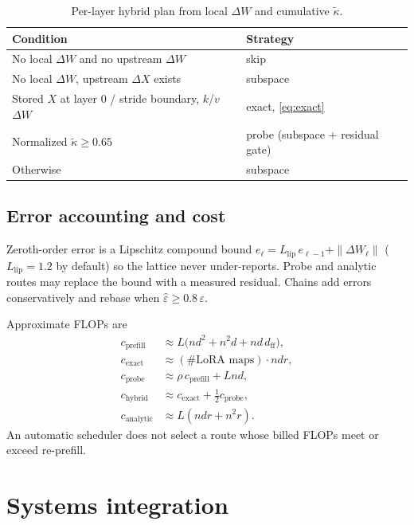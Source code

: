 \documentclass{article}
\begin{document}
\begin{table}[t]
\centering
\caption{Per-layer hybrid plan from local $\Delta W$ and cumulative
$\tilde\kappa$.}
\label{tab:plan}
\begin{tabular}{@{}ll@{}}
\toprule
Condition & Strategy \\
\midrule
No local $\Delta W$ and no upstream $\Delta W$ & skip \\
No local $\Delta W$, upstream $\Delta X$ exists & subspace \\
Stored $X$ at layer $0$ / stride boundary, $k$/$v$ $\Delta W$ & exact, \eqref{eq:exact} \\
Normalized $\tilde\kappa\ge 0.65$ & probe (subspace $+$ residual gate) \\
Otherwise & subspace \\
\bottomrule
\end{tabular}
\end{table}

\subsection{Error accounting and cost}
\label{sec:cost}

Zeroth-order error is a Lipschitz compound bound
$e_{\ell}=L_{\mathrm{lip}}\,e_{\ell-1}+\|\Delta W_\ell\|$
($L_{\mathrm{lip}}=1.2$ by default) so the lattice never under-reports.
Probe and analytic routes may replace the bound with a measured residual.
Chains add errors conservatively and rebase when
$\hat\varepsilon\ge 0.8\,\varepsilon$.

Approximate FLOPs are
\begin{align}
  c_{\mathrm{prefill}} &\approx L\bigl(nd^2 + n^2 d + nd\,d_{\mathrm{ff}}\bigr),\\
  c_{\mathrm{exact}}   &\approx (\#\text{LoRA maps})\cdot ndr,\\
  c_{\mathrm{probe}}   &\approx \rho\, c_{\mathrm{prefill}} + Lnd,\\
  c_{\mathrm{hybrid}}  &\approx c_{\mathrm{exact}} + \tfrac12 c_{\mathrm{probe}},\\
  c_{\mathrm{analytic}}&\approx L(ndr + n^2 r).
\end{align}
An automatic scheduler does not select a route whose billed FLOPs meet
or exceed re-prefill.

\section{Systems integration}
\label{sec:systems}
\end{document}
